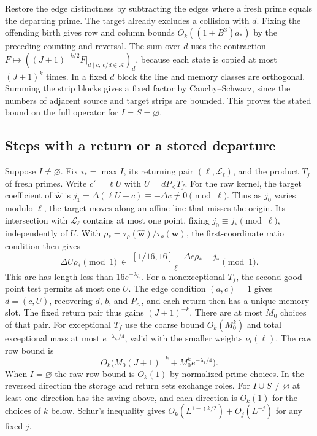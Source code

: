 \documentclass[11pt]{amsart}
\numberwithin{equation}{section}
\theoremstyle{remark}
\begin{document}
Restore the edge distinctness by subtracting the edges where a fresh
prime equals the departing prime. The target already excludes a
collision with $d$. Fixing the offending birth gives row and column
bounds $O_k((1+B^3)a_*)$ by the preceding counting and reversal.
The sum over $d$ uses the contraction
$F\mapsto((J+1)^{-k/2}F|_{d\mid c,\ c/d\in\mathcal A})_d$,
because each state is copied at most $(J+1)^k$ times. In a fixed $d$
block the line and memory classes are orthogonal. Summing the strip
blocks gives a fixed factor by Cauchy--Schwarz, since the numbers of
adjacent source and target strips are bounded. This proves the stated
bound on the full operator for $I=S=\varnothing$.

\subsection{Steps with a return or a stored departure}

Suppose $I\ne\varnothing$. Fix $i_*=\max I$, its returning pair
$(\ell,\mathcal L_\ell)$, and the product $T_f$ of fresh primes.
Write $c'=\ell U$ with $U=dP_<T_f$. For the raw kernel, the target
coefficient of $\widehat{\mathbf w}$ is
$j_1=\Delta(\ell U-c)\equiv-\Delta c\ne0\pmod\ell$. Thus as $j_0$
varies modulo $\ell$, the target moves along an affine line that
misses the origin. Its intersection with $\mathcal L_\ell$ contains
at most one point, fixing $j_0\equiv j_*\pmod\ell$, independently of
$U$. With $\rho_*=\tau_\rho(\widehat{\mathbf w})/\tau_\rho(\mathbf w)$,
the first-coordinate ratio condition then gives
\[
 \Delta U\rho_*\pmod1\ \in\
 \frac{[1/16,16]+\Delta c\rho_*-j_*}{\ell}\pmod1.
\]
This arc has length less than $16e^{-\lambda_{i_*}}$. For a
nonexceptional $T_f$, the second good-point test permits at most one
$U$. The edge condition $(a,c)=1$ gives $d=(c,U)$, recovering $d$,
$b$, and $P_<$, and each return then has a unique memory slot.
The fixed return pair thus gains $(J+1)^{-k}$. There are at most $M_0$
choices of that pair. For exceptional $T_f$ use the coarse bound
$O_k(M_0^k)$ and total exceptional mass at most $e^{-\lambda_{i_*}/4}$,
valid with the smaller weights $\nu_i(\ell)$. The raw row bound is
\[
 O_k\bigl(M_0(J+1)^{-k}+M_0^k e^{-\lambda_1/4}\bigr).
\]
When $I=\varnothing$ the raw row bound is $O_k(1)$ by normalized
prime choices. In the reversed direction the storage and return
sets exchange roles. For $I\cup S\ne\varnothing$ at least one
direction has the saving above, and each direction is $O_k(1)$ for
the choices of $k$ below. Schur's inequality gives
$O_k(L^{1-\jmath k/2})+O_j(L^{-j})$ for any fixed $j$.
\end{document}
